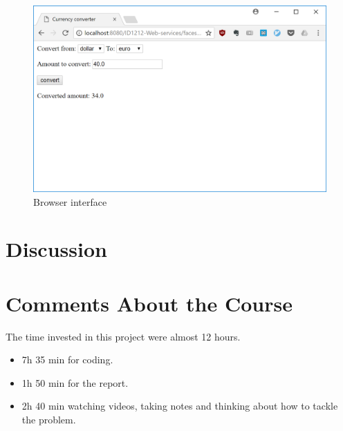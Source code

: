 \documentclass[a4paper]{scrartcl}
\begin{document}
\begin{figure}[h!]
  \begin{center}
    \includegraphics[scale=0.5]{ui.png}
    \caption{Browser interface}
    \label{fig:ui}
  \end{center}
\end{figure}

\section{Discussion}


\section{Comments About the Course}

The time invested in this project were almost 12 hours.
\begin{itemize}
        \item 7h 35 min for coding.
        \item 1h 50 min for the report.
        \item 2h 40 min watching videos, taking notes and thinking about how to tackle the problem.
\end{itemize}
\end{document}
